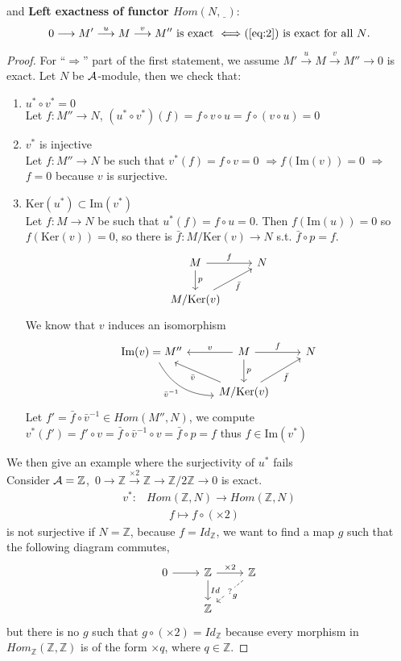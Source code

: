 \documentclass[11pt]{article}
\newcommand{\intg}{\mathbb Z}
\newcommand{\cala}{{\cal A}}
\newcommand{\rta}{\rightarrow}
\newcommand{\Lrta}{\Longrightarrow}
\newcommand{\lrta}{\longrightarrow}
\begin{document}
and 
\textbf{Left exactness of functor $Hom(N,\underline{\ \ })$}:\\
$$
0\lrta M'\overset{u}{\lrta}M\overset{v}{\lrta}M'' \text{ is exact }\Longleftrightarrow (\ref{eq:2})\text{ is exact for all $N$}.
$$
\begin{proof}
For ``$\Lrta$'' part of the first statement, we assume $M'\overset{u}{\lrta}M\overset{v}{\lrta}M'' \lrta0$ is exact. 
Let $N$ be $\cala$-module, then we check that:
\begin{enumerate}
\item $u^*\circ v^*=0$\\
Let $f:M''\lrta N$, $(u^*\circ v^*)(f)=f\circ v\circ u=f\circ(v\circ u)=0$ 
\item $v^*$ is injective\\
Let $f:M''\lrta N$ be such that $v^*(f)=f\circ v=0$ $\Lrta f(\text{Im}(v))=0$ $\Lrta$ $f=0$ because $v$ is surjective.
\item $\text{Ker}(u^*)\subset \text{Im}(v^*)$\\
Let $f:M\lrta N$ be such that $u^*(f)=f\circ u=0$. Then $f(\text{Im}(u))=0$ so $f(\text{Ker}(v))=0$, so there is $\bar{f}:M/\text{Ker}(v)\lrta N$ s.t. $\bar{f}\circ p=f$.
\[
\begin{tikzcd}
 M  \arrow[r,"f"] \arrow[d,"p"] & N \\
M/\text{Ker}(v)\arrow[swap, ur,"\bar{f}"] &    
\end{tikzcd}
\]
We know that $v$ induces an isomorphism 
\[
\begin{tikzcd}
 \text{Im}(v)=M''\arrow[dr,swap,bend right,"\bar{v}^{-1}"]&
 M \arrow[swap,l,"v"] \arrow[r,"f"]  \arrow[d,"p"] & N \\
& M/\text{Ker}(v)\arrow[swap, ur,"\bar{f}"] \arrow[ul,"\bar{v}"]& 
\end{tikzcd}
\]
Let $f'=\bar{f}\circ \bar{v}^{-1}\in Hom(M'',N)$, we compute $v^*(f')=f'\circ v=\bar{f}\circ \bar{v}^{-1}\circ v=\bar{f}\circ p=f$ thus $f\in \text{Im}(v^*)$
\end{enumerate} 
We then give an example where the surjectivity of $u^*$ fails\\
Consider $\cala=\intg$,\ 
$0\lrta \intg\overset{\times 2}{\lrta}\intg\overset{\ }{\lrta}\intg/2\intg \lrta0$ is exact.
$$
\begin{aligned}
v^*: & Hom(\intg, N)\rta Hom(\intg,N) \\
 &\ \ \ \ \ \ \ \ \ f \longmapsto  f\circ(\times 2)
\end{aligned}
$$
 is not surjective if $N=\intg$, because $f=Id_\intg$, we want to find a map $g$ such that the following diagram commutes,
 \[
\begin{tikzcd}
0 \ar[r] & \intg\ar[r,"\times 2"]\ar[d,"Id"] & \intg \ar[dl, dashed,"?"description, "g"] \\
& \intg &
\end{tikzcd}
 \]
 but there is no $g$ such that $g\circ(\times 2)=Id_\intg$ because every morphism in $Hom_\intg(\intg,\intg)$ is of the form $\times q$, where $q\in\intg$.


\end{proof}
\end{document}
